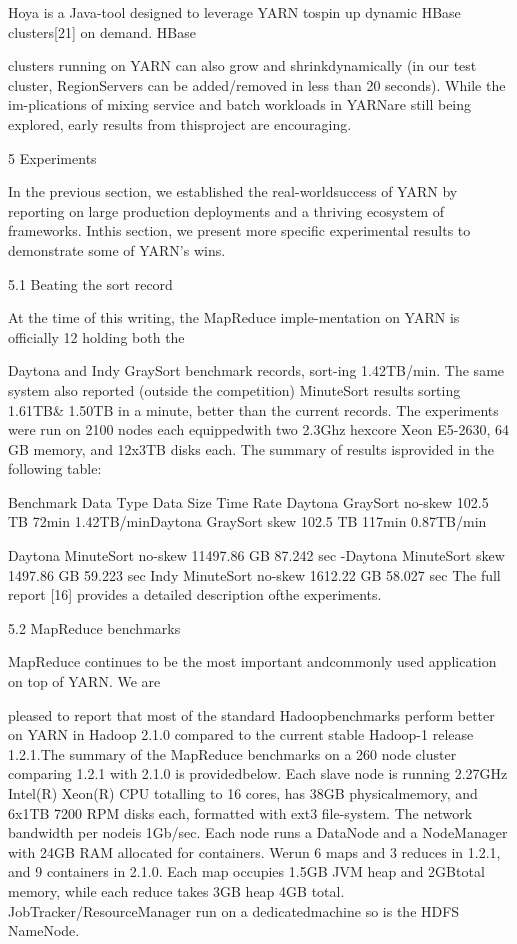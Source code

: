 Hoya is a Java-tool designed to leverage YARN tospin up dynamic HBase clusters[21] on demand. HBase

clusters running on YARN can also grow and shrinkdynamically (in our test cluster, RegionServers can be
added/removed in less than 20 seconds). While the im-plications of mixing service and batch workloads in
YARNare still being explored, early results from thisproject are encouraging.

5 Experiments

In the previous section, we established the real-worldsuccess of YARN by reporting on large production deployments and a thriving ecosystem of frameworks. Inthis section, we present more specific experimental results to demonstrate some of YARN's wins.

5.1 Beating the sort record

At the time of this writing, the MapReduce imple-mentation on YARN is officially 12 holding both the

Daytona and Indy GraySort benchmark records, sort-ing 1.42TB/min. The same system also reported (outside the competition) MinuteSort results sorting 1.61TB& 1.50TB in a minute, better than the current records.
The experiments were run on 2100 nodes each equippedwith two 2.3Ghz hexcore Xeon E5-2630, 64 GB memory, and 12x3TB disks each. The summary of results isprovided in the following table:

Benchmark Data Type Data Size Time Rate
Daytona GraySort no-skew 102.5 TB 72min 1.42TB/minDaytona GraySort skew 102.5 TB 117min 0.87TB/min

Daytona MinuteSort no-skew 11497.86 GB 87.242 sec -Daytona MinuteSort skew 1497.86 GB 59.223 sec Indy MinuteSort no-skew 1612.22 GB 58.027 sec The full report [16] provides a detailed description ofthe experiments.

5.2 MapReduce benchmarks

MapReduce continues to be the most important andcommonly used application on top of YARN. We are

pleased to report that most of the standard Hadoopbenchmarks perform better on YARN in Hadoop 2.1.0
compared to the current stable Hadoop-1 release 1.2.1.The summary of the MapReduce benchmarks on a 260
node cluster comparing 1.2.1 with 2.1.0 is providedbelow. Each slave node is running 2.27GHz Intel(R)
Xeon(R) CPU totalling to 16 cores, has 38GB physicalmemory, and 6x1TB 7200 RPM disks each, formatted
with ext3 file-system. The network bandwidth per nodeis 1Gb/sec. Each node runs a DataNode and a NodeManager with 24GB RAM allocated for containers. Werun 6 maps and 3 reduces in 1.2.1, and 9 containers in
2.1.0. Each map occupies 1.5GB JVM heap and 2GBtotal memory, while each reduce takes 3GB heap 4GB
total. JobTracker/ResourceManager run on a dedicatedmachine so is the HDFS NameNode.

